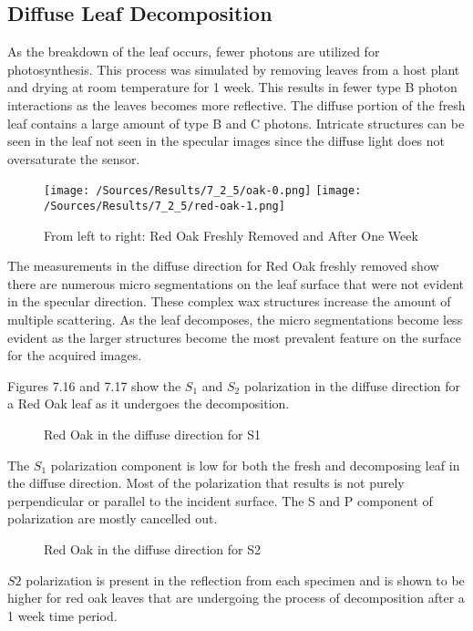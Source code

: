 \subsection{Diffuse Leaf Decomposition}
As the breakdown of the leaf occurs, fewer photons are utilized for photosynthesis. This process was simulated by removing leaves from a host plant and drying at room temperature for 1 week.  This results in fewer type B photon interactions as the leaves becomes more reflective.  The diffuse portion of the fresh leaf contains a large amount of type B and C photons.  Intricate structures can be seen in the leaf not seen in the specular images since the diffuse light does not oversaturate the sensor.
%
\begin{figure}[htp]
    \centering
    \hspace*{\fill}%
    \texttt{[image: /Sources/Results/7\_2\_5/oak-0.png]}\hfill%
    \texttt{[image: /Sources/Results/7\_2\_5/red-oak-1.png]}
    \hspace*{\fill}%
    \caption{From left to right: Red Oak Freshly Removed and After One Week}
    \label{fig:specular-raw-decompose}
\end{figure}
%
The measurements in the diffuse direction for Red Oak freshly removed show there are numerous micro segmentations on the leaf surface that were not evident in the specular direction.  These complex wax structures increase the amount of multiple scattering.  As the leaf decomposes, the micro segmentations become less evident as the larger structures become the most prevalent feature on the surface for the acquired images.

Figures 7.16 and 7.17 show the $S_1$ and $S_2$ polarization in the diffuse direction for a Red Oak leaf as it undergoes the decomposition.
%
\begin{sidewaysfigure}
    \begin{center}
    \end{center}
    \caption{Red Oak in the diffuse direction for S1}
    \label{fig:polarization}
\end{sidewaysfigure}
%
The $S_1$ polarization component is low for both the fresh and decomposing leaf in the diffuse direction.  Most of the polarization that results is not purely perpendicular or parallel to the incident surface.  The S and P component of polarization are mostly cancelled out.
%
\begin{sidewaysfigure}
    \begin{center}
    \end{center}
    \caption{Red Oak in the diffuse direction for S2}
    \label{fig:polarization}
\end{sidewaysfigure}
%
$S2$ polarization is present in the reflection from each specimen and is shown to be higher for red oak leaves that are undergoing the process of decomposition after a 1 week time period.

